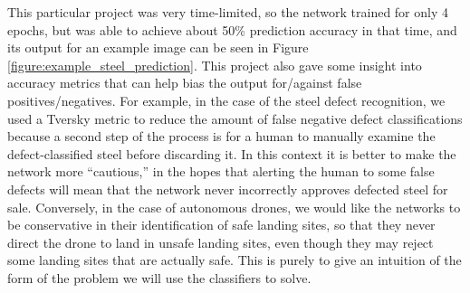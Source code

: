 This particular project was very time-limited, so the network trained for only 4 epochs,
but was able to achieve about 50\% prediction accuracy in that time,
and its output for an example image can be seen in Figure \ref{figure:example_steel_prediction}.
This project also gave some insight into accuracy metrics that can help bias the output
for/against false positives/negatives.
For example, in the case of the steel defect recognition, we used a Tversky metric to
reduce the amount of false negative defect classifications because a second step of the
process is for a human to manually examine the defect-classified steel before discarding it.
In this context it is better to make the network more ``cautious,'' in the hopes that
alerting the human to some false defects will mean that the network never incorrectly approves
defected steel for sale.
Conversely, in the case of autonomous drones,
we would like the networks to be conservative in their identification of safe landing sites,
so that they never direct the drone to land in unsafe landing sites, even though they may reject
some landing sites that are actually safe.
This is purely to give an intuition of the form of the problem we will use the classifiers to solve.

